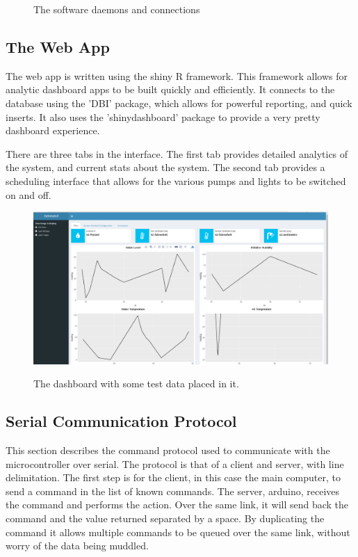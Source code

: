 \documentclass[american,12pt]{article}
\begin{document}
\begin{figure}[h]
    \centering
    \caption{The software daemons and connections}
    \label{fig:Software Architecture}
\end{figure}

\subsection{The Web App}
The web app is written using the shiny R framework. This framework allows for 
analytic dashboard apps to be built quickly and efficiently. It connects to
the database using the 'DBI' package, which allows for powerful reporting, and
quick inserts. It also uses the 'shinydashboard' package to provide a very
pretty dashboard experience.

There are three tabs in the interface. The first tab provides detailed
analytics of the system, and current stats about the system. The second
tab provides a scheduling interface that allows for the various pumps
and lights to be switched on and off. 

\begin{figure}[h]
	\includegraphics[width=\linewidth]{imgs/WebappDashboard}
	\label{fig:data dashboard}
	\caption{The dashboard with some test data placed in it.}
\end{figure}

\subsection{Serial Communication Protocol}
This section describes the command protocol used to communicate with the
microcontroller over serial. The protocol is that of a client and server,
with line delimitation. The first step is for the client, in this case the
main computer, to send a command in the list of known commands. The server,
arduino, receives the command and performs the action. Over the same link, it
will send back the command and the value returned separated by a space. By
duplicating the command it allows multiple commands to be queued over the same
link, without worry of the data being muddled.
\end{document}
